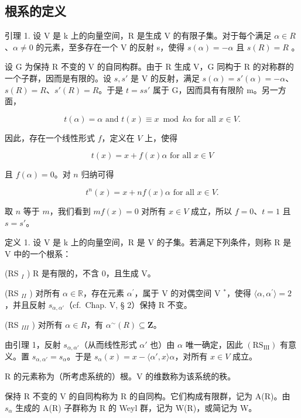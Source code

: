 \subsection{根系的定义}

引理 1. 设 V 是 k 上的向量空间，R 是生成 V 的有限子集。对于每个满足 \(\alpha \in R\)、\(\alpha \neq 0\) 的元素，至多存在一个 V 的反射 s，使得 \(s(\alpha) = -\alpha\) 且 \(s(R) = R\) 。

设 G 为保持 R 不变的 V 的自同构群。由于 R 生成 V，G 同构于 R 的对称群的一个子群，因而是有限的。设 \(s, s'\) 是 V 的反射，满足 \(s(\alpha) = s'(\alpha) = -\alpha\)、\(s(R) = R\)、\(s'(R) = R\)。于是 \(t = ss'\) 属于 G，因而具有有限阶 m。另一方面，

\[
t (\alpha) = \alpha \text { and } t (x) \equiv x \bmod k \alpha \text { for   all } x \in V.
\]

因此，存在一个线性形式 \(f\)，定义在 \(V\) 上，使得

\[
t (x) = x + f (x) \alpha \text {   for   all   } x \in V
\]

且 \(f(\alpha) = 0\)。对 \(n\) 归纳可得

\[
t ^ {n} (x) = x + n f (x) \alpha \text {   for   all   } x \in V.
\]

取 \(n\) 等于 \(m\)，我们看到 \(mf(x) = 0\) 对所有 \(x \in V\) 成立，所以 \(f = 0\)、\(t = 1\) 且 \(s = s'\)。

定义 1. 设 V 是 k 上的向量空间，R 是 V 的子集。若满足下列条件，则称 R 是 V 中的一个根系：

(RS \(_{I}\) ) R 是有限的，不含 0，且生成 V。

(RS \(_{II}\) ) 对所有 \(\alpha \in \mathbb{R}\)，存在元素 \(\alpha^{\prime}\)，属于 V 的对偶空间 V \(^{*}\)，使得 \(\langle \alpha, \alpha^{\prime} \rangle = 2\)，并且反射 \(s_{\alpha, \alpha'}\)（cf.~Chap. V, § 2）保持 R 不变。

(RS \(_{III}\) ) 对所有 \(\alpha \in R\)，有 \(\alpha^{\sim}(R) \subseteq \mathbf{Z}\)。

由引理 1，反射 \(s_{\alpha, \alpha'}\)（从而线性形式 \(\alpha'\) 也）由 \(\alpha\) 唯一确定，因此 \((\mathrm{RS}_{\mathrm{III}})\) 有意义。置 \(s_{\alpha, \alpha'} = s_{\alpha}\)。于是 \(s_{\alpha}(x) = x - \langle \alpha', x \rangle \alpha\)，对所有 \(x \in V\) 成立。

R 的元素称为（所考虑系统的）根。V 的维数称为该系统的秩。

保持 R 不变的 V 的自同构称为 R 的自同构。它们构成有限群，记为 A(R)。由 \(s_{\alpha}\) 生成的 A(R) 子群称为 R 的 Weyl 群，记为 W(R)，或简记为 W。

